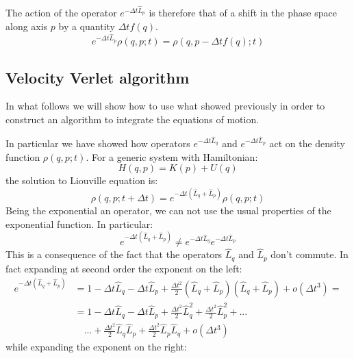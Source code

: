             The action of the operator $e^{-\Delta t\hat{L}_p}$ is therefore that of a shift in the phase space along axis $p$ by a quantity $\Delta t f(q)$.
            \begin{equation}
                e^{-\Delta t\hat{L}_p}\rho(q,p;t)=\rho(q,p-\Delta t f(q);t)
            \end{equation}
            
        \subsection{Velocity Verlet algorithm}
        In what follows we will show how to use what showed previously in order to construct an algorithm to integrate the equations of motion.
        
        In particular we have showed how operators $e^{-\Delta t \hat{L}_q}$ and $e^{-\Delta t \hat{L}_p}$ act on the density function $\rho(q,p;t)$.
        For a generic system with Hamiltonian:
        \begin{equation}
            H(q,p)=K(p)+U(q)
        \end{equation}
        the solution to Liouville equation is:
        \begin{equation}
            \rho(q,p;t+\Delta t)=e^{-\Delta t (\hat{L}_q+\hat{L}_p)}\rho(q,p;t)
        \end{equation}
        Being the exponential an operator, we can not use the usual properties of the exponential function. In particular: \begin{equation}\label{eq:expinequality}
            e^{-\Delta t (\hat{L}_q+\hat{L}_p)}\neq e^{-\Delta t \hat{L}_q}e^{-\Delta t \hat{L}_p}
        \end{equation}
        This is a consequence of the fact that the operators $\hat{L}_q$ and $\hat{L}_p$ don't commute. In fact expanding at second order the exponent on the left:
        \begin{align*}
            e^{-\Delta t (\hat{L}_q+\hat{L}_p)}&= 1-\Delta t\hat{L}_q-\Delta t\hat{L}_p+\frac{\Delta t^2}{2}(\hat{L}_q+\hat{L}_p)(\hat{L}_q+\hat{L}_p)+o(\Delta t^3)=\\
            &= 1-\Delta t\hat{L}_q-\Delta t\hat{L}_p+\frac{\Delta t^2}{2}\hat{L}_q^2+\frac{\Delta t^2}{2}\hat{L}_p^2+...\\ &\quad...+\frac{\Delta t^2}{2}\hat{L}_q\hat{L}_p+\frac{\Delta t^2}{2}\hat{L}_p\hat{L}_q+o(\Delta t^3)
        \end{align*} 
        while expanding the exponent on the right:
